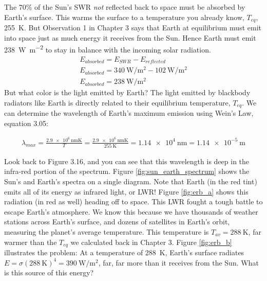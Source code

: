 \documentclass[amstex,12pt]{book}
\begin{document}
The 70\% of the Sun's SWR \emph{not} reflected back to space must be absorbed by Earth's surface. This warms the surface to a temperature you already know, $T_{eq}$, \SI{255}{\kelvin}. But Observation 1 in Chapter 3 says that Earth at equilibrium must emit into space just as much energy it receives from the Sun. Hence Earth must emit \SI{238}{\watt\per\m^2} to stay in balance with the incoming solar radiation. 
\begin{align}
	E_{absorbed}=E_{SWR}-E_{reflected}\\
	E_{absorbed}=\SI{340}{\watt\per\m^{2}}-\SI{102}{\watt\per\m^{2}}\\ \label{eq:eabs}
	E_{absorbed}=\SI{238}{\watt\per\m^{2}}
\end{align}
But what color is the light emitted by Earth? The light emitted by blackbody radiators like Earth is directly related to their equilibrium temperature, $T_{eq}$. We can determine the wavelength of Earth's maximum emission using Wein’s Law, equation 3.05:
	 
	 \begin{align}
\lambda_{max}=\frac{\SI{2.9e6}{\nano\metre\kelvin}}{T}=	\frac{\SI{2.9e6}{\nano\metre\kelvin}}{\SI{255}{\kelvin}} =\SI{1.14e4}{\nano\metre}=\SI{1.14e-5}{\metre} \label{eq:lambda_earth}
	 \end{align}

Look back to Figure 3.16, and you can see that this wavelength is deep in the infra-red portion of the spectrum. Figure \ref{fig:sun_earth_spectrum} shows the Sun's and Earth's spectra on a single diagram. Note that Earth (in the red tint) emits all of its energy as infrared light, or LWR! Figure \ref{fig:erb_a} shows this radiation (in red as well) heading off to space. This LWR fought a tough battle to escape Earth's atmosphere. We know this because we have thousands of weather stations across Earth's surface, and dozens of satellites in Earth's orbit, measuring the planet's average temperature. This temperature is $T_{av}=\SI{288}{\kelvin}$, far warmer than the $T_{eq}$ we calculated back in Chapter 3. Figure \ref{fig:erb_b} illustrates the problem: At a temperature of \SI{288}{\kelvin}, Earth's surface radiates $E=\sigma (\SI{288}{\kelvin})^4 = \SI{390}{\watt\per\m^2}$, far, far more than it receives from the Sun. What is this source of this energy?\\
\end{document}
